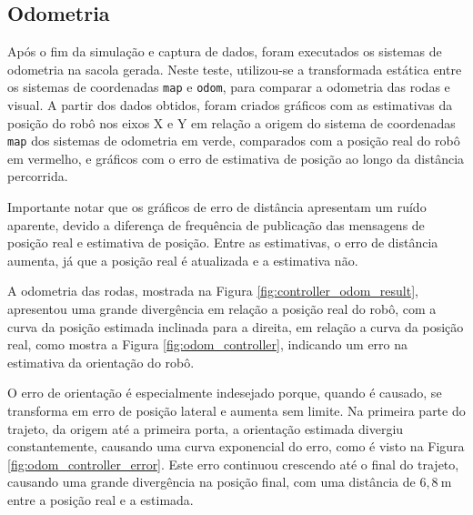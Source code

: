 \documentclass[repeatfields,xlists,xpacks,oneside,yearsonly]{ufrgscca}
\begin{document}
\subsection{Odometria}

Após o fim da simulação e captura de dados, foram executados os
sistemas de odometria na sacola gerada. Neste teste, utilizou-se a
transformada estática entre os sistemas de coordenadas \texttt{map} e
\texttt{odom}, para comparar a odometria das rodas e visual. A partir
dos dados obtidos, foram criados gráficos com as estimativas da
posição do robô nos eixos X e Y em relação a origem do sistema de
coordenadas \texttt{map} dos sistemas de odometria em verde,
comparados com a posição real do robô em vermelho, e gráficos com o
erro de estimativa de posição ao longo da distância percorrida.

Importante notar que os gráficos de erro de distância apresentam 
um ruído aparente, devido a diferença de frequência de publicação
das mensagens de posição real e estimativa de posição. Entre as 
estimativas, o erro de distância aumenta, já que a posição real 
é atualizada e a estimativa não.

A odometria das rodas, mostrada na Figura
\ref{fig:controller_odom_result}, apresentou uma grande divergência
em relação a posição real do robô, com a curva da posição estimada
inclinada para a direita, em relação a curva da posição real, como
mostra a Figura \ref{fig:odom_controller}, indicando um erro na
estimativa da orientação do robô.

O erro de orientação é especialmente indesejado porque, quando é
causado, se transforma em erro de posição lateral e aumenta sem
limite\cite{borenstein}. Na primeira parte do trajeto, da origem até
a primeira porta, a orientação estimada divergiu constantemente,
causando uma curva exponencial do erro, como é visto na Figura
\ref{fig:odom_controller_error}. Este erro continuou crescendo até o
final do trajeto, causando uma grande divergência na posição final,
com uma distância de $6,8~\si{\meter}$ entre a posição real e a
estimada.
\end{document}
